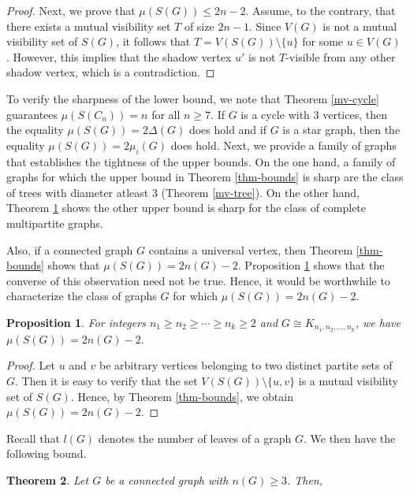 \documentclass[a4paper,12pt]{article}
\newtheorem{theorem}{Theorem}[section]
\newtheorem{proposition}[theorem]{Proposition}
\begin{document}
{\begin{proof}
Next, we prove that $\mu(S(G)) \leq 2n - 2$. Assume, to the contrary, that there exists a mutual visibility set $T$ of size $2n - 1$. Since $V(G)$ is not a mutual visibility set of $S(G)$, it follows that $T = V(S(G)) \setminus \{u\}$ for some $u \in V(G)$. However, this implies that the shadow vertex $u'$ is not $T$-visible from any other shadow vertex, which is a contradiction.
  

\end{proof} 
To verify the sharpness of the lower bound, we note that Theorem \ref{mv-cycle} guarantees $\mu(S(C_n))=n$  for all $n\geq7$. If $G$ is a cycle with $3$ vertices, then the equality $\mu(S(G))= 2\Delta(G)$ does hold and if $G$ is a star graph, then the equality $\mu(S(G)) = 2 \mu_{i}(G)$ does hold. Next, we provide a family of graphs that establishes the tightness of the upper bounds. On the one hand, a family of graphs for which the upper bound in Theorem \ref{thm-bounds} is sharp are the class of trees with diameter atleast $3$ (Theorem \ref{mv-tree}). On the other hand, Theorem \ref{thm_multipartite} shows the other upper bound is sharp for the class of complete multipartite graphs.

Also, if a connected graph $G$ contains a universal vertex, then Theorem \ref{thm-bounds} shows that $\mu(S(G))=2n(G)-2$. Proposition \ref{thm_multipartite} shows that the converse of this observation need not be true. Hence, it would be worthwhile to characterize the class of graphs $G$ for which $\mu(S(G))=2n(G)-2$. 
 


\begin{proposition}   

    \label{thm_multipartite}
For integers $n_1 \geq n_2 \geq \cdots \geq n_k \geq 2$ and 
$G \cong K_{n_1,n_2,\ldots,n_k}$, we have $
\mu(S(G)) = 2n(G) - 2.$

 \end{proposition}
  \begin{proof}
Let $u$ and $v$ be arbitrary vertices belonging to two distinct partite sets of $G$.
Then it is easy to verify that the set 
$V(S(G)) \setminus \{u,v\}$ is a mutual visibility set of $S(G)$. 
Hence, by Theorem \ref{thm-bounds}, we obtain $
\mu(S(G)) = 2n(G) - 2$.
 \end{proof}
Recall that $l(G)$ denotes the number of leaves of a graph $G$. 
We then have the following bound.

 
\begin{theorem}\label{thm:graph-inequality}
Let $G$ be a connected graph with $n(G)\geq 3$. Then, 


\end{theorem}}
\end{document}
